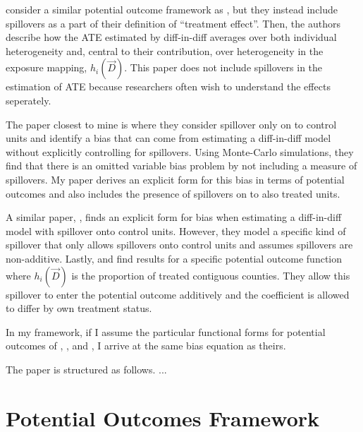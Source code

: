\documentclass[11pt]{article}
\begin{document}
\citet{Sävje_Aronow_Hudgens_2019} consider a similar potential outcome framework as \citet{Vazquez-Bare_2019}, but they instead include spillovers as a part of their definition of ``treatment effect''. Then, the authors describe how the ATE estimated by diff-in-diff averages over both individual heterogeneity and, central to their contribution, over heterogeneity in the exposure mapping, $h_i(\vec{D})$. This paper does not include spillovers in the estimation of ATE because researchers often wish to understand the effects seperately.

The paper closest to mine is \citet{Delgado_Florax_2015} where they consider spillover only on to control units and identify a bias that can come from estimating a diff-in-diff model without explicitly controlling for spillovers. Using Monte-Carlo simulations, they find that there is an omitted variable bias problem by not including a measure of spillovers. My paper derives an explicit form for this bias in terms of potential outcomes and also includes the presence of spillovers on to also treated units.

A similar paper, \citet{Clarke_2017}, finds an explicit form for bias when estimating a diff-in-diff model with spillover onto control units. However, they model a specific kind of spillover that only allows spillovers onto control units and assumes spillovers are non-additive. Lastly, \citet{Berg_Streitz_2019} and \citet{Verbitsky-Savitz_Raudenbush_2012} find results for a specific potential outcome function where $h_i(\vec{D})$ is the proportion of treated contiguous counties. They allow this spillover to enter the potential outcome additively and the coefficient is allowed to differ by own treatment status.

In my framework, if I assume the particular functional forms for potential outcomes of \citet{Clarke_2017}, \citet{Berg_Streitz_2019}, and \citet{Verbitsky-Savitz_Raudenbush_2012}, I arrive at the same bias equation as theirs. 

The paper is structured as follows. ...









\section{Potential Outcomes Framework}
\end{document}
